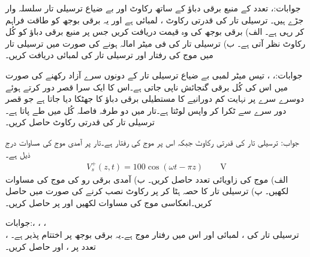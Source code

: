 جوابات:، 
تعدد  کے منبع برقی دباؤ کے ساتھ رکاوٹ  اور بے ضیاع ترسیلی تار سلسلہ وار جڑے ہیں۔ ترسیلی تار کی قدرتی رکاوٹ ، لمبائی  ہے اور یہ برقی بوجھ  کو طاقت فراہم کر رہی ہے۔ الف) برقی بوجھ کی وہ قیمت دریافت کریں جس پر منبع برقی دباؤ کو کُل  رکاوٹ نظر آتی ہے۔ ب) ترسیلی تار کی فی میٹر امالہ  ہونے کی صورت میں ترسیلی تار میں موج کی رفتار اور ترسیلی تار کی لمبائی دریافت کریں۔ 

جوابات:، ، 
تیس میٹر لمبی بے ضیاع ترسیلی تار کے دونوں سرے آزاد رکھنے کی صورت میں اس کی کُل برقی گنجائش  ناپی جاتی ہے۔اس کا ایک سرا قصر دور کرتے ہوئے دوسرے سرے پر نہایت کم دورانیے کا مستطیلی برقی دباؤ کا جھٹکا دیا جاتا ہے جو قصر دور سرے سے ٹکرا کر واپس لوٹتا ہے۔تار میں دو طرفہ فاصلہ کُل  میں طے پاتا ہے۔ترسیلی تار کی قدرتی رکاوٹ حاصل کریں۔

جواب:  
ترسیلی تار کی قدرتی رکاوٹ  جبکہ اس پر موج کی رفتار  ہے۔تار پر آمدی موج کی مساوات درج ذیل ہے۔
\begin{align*}
V_s^{+}(z,t)=100 \cos(\omega t -\pi z) \quad \quad  \si{\volt}
\end{align*}
 الف) موج کی زاویائی تعدد حاصل کریں۔ ب) آمدی برقی رو کی موج کی مساوات لکھیں۔ پ) ترسیلی تار کا  حصہ ہٹا کر  پر  رکاوٹ نصب کرنے کی صورت میں  حاصل کریں۔انعکاسی موج  کی مساوات لکھیں اور  پر  حاصل کریں۔

جوابات:، ،
 ، \\
، 
ترسیلی تار کی ، لمبائی  اور اس میں رفتار موج  ہے۔یہ  برقی بوجھ پر اختتام پذیر ہے۔تعدد  پر  ،  اور  حاصل کریں۔

